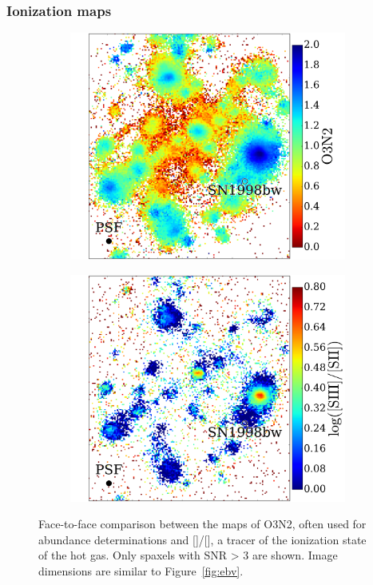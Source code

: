 \documentclass[traditabstract]{aa}
\newcommand{\sii}{[\ion{S}{ii}]}
\newcommand{\siii}{[\ion{S}{iii}]}
\begin{document}
\subsubsection{Ionization maps}

\begin{figure}
\begin{subfigure}{.24\textwidth}
  \includegraphics[width=0.999\linewidth]{Figs/MUSE_SN1998bw_O3N2.pdf}
\end{subfigure}
\begin{subfigure}{.24\textwidth}
  \includegraphics[width=0.999\linewidth]{Figs/MUSE_SN1998bw_S3S2.pdf}
\end{subfigure}
\caption{Face-to-face comparison between the maps of O3N2, often used for abundance determinations and \siii/\sii, a tracer of the ionization state of the hot gas. Only spaxels with SNR > 3 are shown. Image dimensions are similar to Figure~\ref{fig:ebv}.}
\label{fig:s3s2}
\end{figure}
\end{document}
